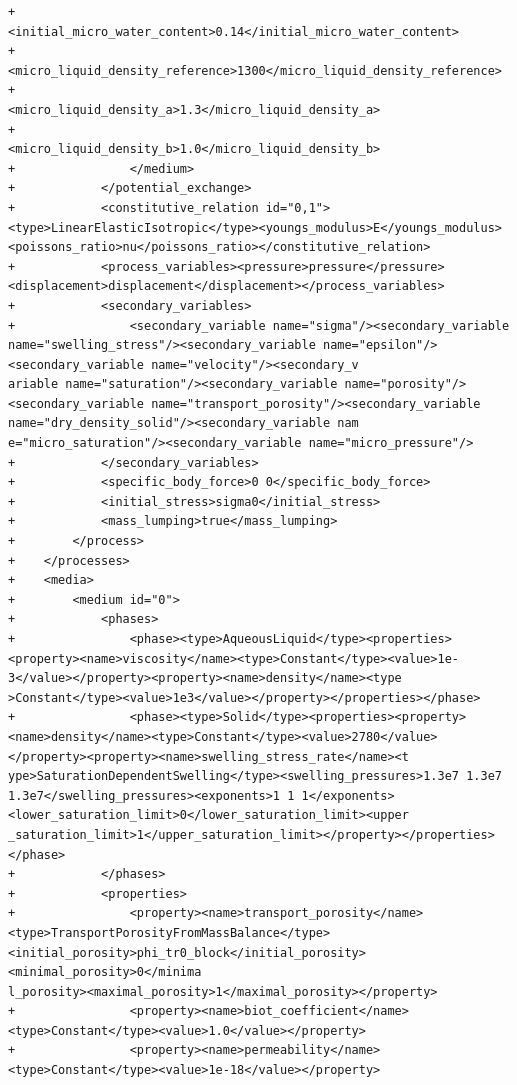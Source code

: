 \documentclass[10pt]{article}
\begin{document}
\begin{lstlisting}
+                    <initial_micro_water_content>0.14</initial_micro_water_content>
+                    <micro_liquid_density_reference>1300</micro_liquid_density_reference>
+                    <micro_liquid_density_a>1.3</micro_liquid_density_a>
+                    <micro_liquid_density_b>1.0</micro_liquid_density_b>
+                </medium>
+            </potential_exchange>
+            <constitutive_relation id="0,1"><type>LinearElasticIsotropic</type><youngs_modulus>E</youngs_modulus><poissons_ratio>nu</poissons_ratio></constitutive_relation>
+            <process_variables><pressure>pressure</pressure><displacement>displacement</displacement></process_variables>
+            <secondary_variables>
+                <secondary_variable name="sigma"/><secondary_variable name="swelling_stress"/><secondary_variable name="epsilon"/><secondary_variable name="velocity"/><secondary_v
ariable name="saturation"/><secondary_variable name="porosity"/><secondary_variable name="transport_porosity"/><secondary_variable name="dry_density_solid"/><secondary_variable nam
e="micro_saturation"/><secondary_variable name="micro_pressure"/>
+            </secondary_variables>
+            <specific_body_force>0 0</specific_body_force>
+            <initial_stress>sigma0</initial_stress>
+            <mass_lumping>true</mass_lumping>
+        </process>
+    </processes>
+    <media>
+        <medium id="0">
+            <phases>
+                <phase><type>AqueousLiquid</type><properties><property><name>viscosity</name><type>Constant</type><value>1e-3</value></property><property><name>density</name><type
>Constant</type><value>1e3</value></property></properties></phase>
+                <phase><type>Solid</type><properties><property><name>density</name><type>Constant</type><value>2780</value></property><property><name>swelling_stress_rate</name><t
ype>SaturationDependentSwelling</type><swelling_pressures>1.3e7 1.3e7 1.3e7</swelling_pressures><exponents>1 1 1</exponents><lower_saturation_limit>0</lower_saturation_limit><upper
_saturation_limit>1</upper_saturation_limit></property></properties></phase>
+            </phases>
+            <properties>
+                <property><name>transport_porosity</name><type>TransportPorosityFromMassBalance</type><initial_porosity>phi_tr0_block</initial_porosity><minimal_porosity>0</minima
l_porosity><maximal_porosity>1</maximal_porosity></property>
+                <property><name>biot_coefficient</name><type>Constant</type><value>1.0</value></property>
+                <property><name>permeability</name><type>Constant</type><value>1e-18</value></property>

\end{lstlisting}
\end{document}
